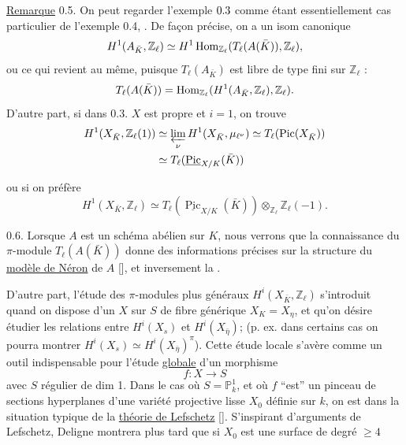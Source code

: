 \uline{Remarque} 0.5. On peut regarder l'exemple $0.{3}$ comme étant essentiellement   cas particulier de l'exemple 0.4, .
De façon précise,  on a un isom canonique
\[
 H^1(A_{\bar K},\mathbb Z_\ell)\simeq {{H^1}}\operatorname{Hom}_{\mathbb Z_\ell}(T_\ell(A(\bar K)),\mathbb Z_\ell),
\]
ou ce qui revient au même, puisque $T_\ell(A_{\bar K})$ est libre de type fini sur $\mathbb Z_\ell$ :
\[
 T_\ell(A(\bar K))=\operatorname{Hom}_{\mathbb Z_\ell}(H^1{(}A_{\bar K},\mathbb Z_\ell),\mathbb Z_\ell).
\]
D'autre part,  si  dans 0.3. $X$ est propre et $i=1$, on trouve
\[
\begin{aligned}
 H^1(X_{\bar K},\mathbb Z_\ell(1))&\simeq\varprojlim_\nu H^1(X_{\bar K},\mu_{\ell^\nu})\simeq T_\ell(\operatorname{Pic}(X_{\bar K}))\\
 &\simeq T_\ell(\underline{\operatorname{Pic}}_{X/K}(\bar K))
\end{aligned}
\]

ou si on préfère
\[
 H^1(X_{\bar K},\mathbb Z_\ell)\simeq T_\ell(\underline{\operatorname{Pic}}_{X/K}(\bar K))\otimes_{\mathbb Z_\ell}\mathbb Z_\ell(-1).
\]

0.6. Lorsque $A$ est un schéma abélien sur $K$, nous verrons que la connaissance du $\pi$-module $T_\ell(A(\bar K))$ donne des informations  précises sur la structure du \uline{modèle de Néron} de $A$ [\quad], et inversement la .

D'autre part, l'étude des $\pi$-modules plus généraux $H^i(X_{\bar K},\mathbb Z_\ell)$ s'introduit quand on  dispose d'un   $X$  sur $S$ de fibre générique $X_K=X_\eta$, et qu'on désire étudier les relations entre  $H^i(X_s)$ et $H^i(X_{\bar\eta})$; (p. ex. dans certains cas on pourra montrer $H^i(X_s)\simeq H^i(X_{\bar\eta})^\pi$). Cette  étude locale s'avère comme un outil indispensable pour l'étude  \uline{globale} d'un morphisme
\[
 f:X\longrightarrow S
\]
avec $S$ régulier de dim 1.  Dans le cas où $S=\mathbb P^1_k$, et où $f$ ``est''  un pinceau  de sections hyperplanes d'une variété projective lisse $X_0$ définie sur $k$, on est dans la situation typique de la \uline{théorie de Lefschetz} [\quad]. S'inspirant d'arguments de Lefschetz, Deligne montrera plus tard que si $X_0$ est une surface de degré $\geq4$

